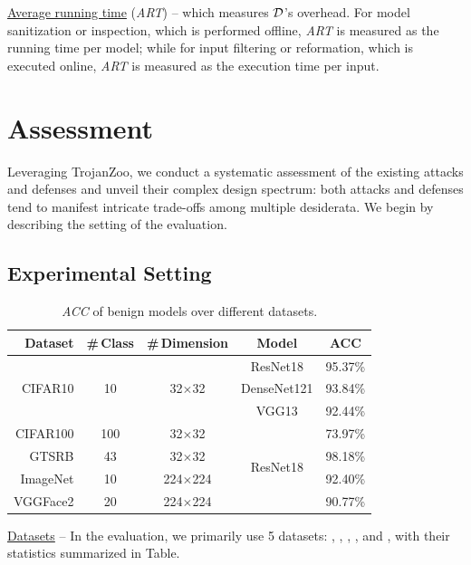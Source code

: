 \documentclass[compsoc,conference,a4paper,10pt,times]{IEEEtran}
\newcommand{\system}{{\sc \small TrojanZoo}\xspace}
\newcommand{\acc}{{\em \small ACC}\xspace}
\newcommand{\art}{{\em \small ART}\xspace}
\begin{document}
\vspace{1pt}
{\underline{Average running time}} (\art) -- which measures ${\mathcal{D}}$'s overhead. For model sanitization or inspection, which is performed offline, \art is measured as the running time per model; while for input filtering or reformation, which is executed online, \art is measured as the execution time per input.



\section{Assessment}
\label{sec:evaluation}


Leveraging \system, we conduct a systematic assessment of the existing attacks and defenses and unveil their complex design spectrum: both attacks and defenses tend to manifest intricate trade-offs among multiple desiderata. We begin by describing the setting of the evaluation.

\subsection{Experimental Setting}


\begin{table}[!ht]{\footnotesize 
\centering
\renewcommand{\arraystretch}{1.2}
\begin{tabular}{r|c|c|c|c}
{Dataset} & {\#\,Class} & {\#\,Dimension} & {Model} & {ACC} \\
\hline
\hline
\multirow{3}{*}{CIFAR10} & \multirow{3}{*}{10} & \multirow{3}{*}{32$\times$32}  & ResNet18 & 95.37\% \\
\cline{4-5}
& & & DenseNet121 & 93.84\% \\
\cline{4-5}
& & &  VGG13 & 92.44\% \\
\hline
CIFAR100 & 100 &  32$\times$32   & \multirow{4}{*}{ResNet18} & 73.97\% \\
\cline{1-3}
\cline{5-5}
GTSRB & 43 & 32$\times$32  &  & 98.18\% \\
\cline{1-3}
\cline{5-5}
ImageNet & 10 & 224$\times$224  & & 92.40\% \\
\cline{1-3}
\cline{5-5}
VGGFace2 & 20 & 224$\times$224  &  & 90.77\% \\
\end{tabular}
\caption{\acc of benign models over different datasets. \label{tab:dataset}}}
\end{table}


{\underline{Datasets} --} In the evaluation, we primarily use 5 datasets: {\cifar}, {\ncifar}, {\imgnet},  {\gtsrb}, and {\vggface}, with their statistics summarized in Table. 
\end{document}
